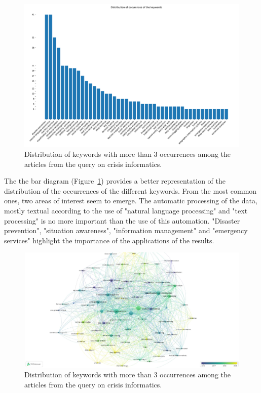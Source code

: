 \begin{figure}[bp]
    \centering
    \includegraphics[width=\textwidth]{figures/chap-2/crisis-informatic-bar.pdf}
    \caption{Distribution of keywords with more than 3 occurrences among the articles from the query on crisis informatics. }
    \label{literature:crisis-informatic-bar}
\end{figure}

The the bar diagram (Figure~\ref{literature:crisis-informatic-bar}) provides a better representation of the distribution of the occurrences of the different keywords.
From the most common ones, two areas of interest seem to emerge.
The automatic processing of the data, mostly textual according to the use of "natural language processing" and "text processing" is no more important than the use of this automation.
"Disaster prevention", "situation awareness", "information management" and "emergency services" highlight the importance of the applications of the results.

\begin{figure}[bp]
    \includegraphics[width=\paperwidth,height=\paperheight,keepaspectratio, angle=90]{figures/chap-2/crisis-informatic-overlay.pdf}
    \caption{Distribution of keywords with more than 3 occurrences among the articles from the query on crisis informatics. }
    \label{literature:crisis-informatic-overlay}
\end{figure}

